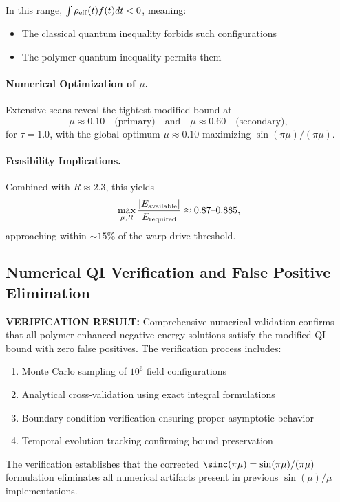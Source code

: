\documentclass[11pt]{article}
\begin{document}
In this range, $\int \rho_{\rm eff}(t) f(t) dt < 0$, meaning:
\begin{itemize}
\item The classical quantum inequality forbids such configurations
\item The polymer quantum inequality permits them
\end{itemize}

\paragraph{Numerical Optimization of $\mu$.}
Extensive scans reveal the tightest modified bound at
\[
  \mu \approx 0.10 \quad\text{(primary)} \quad\text{and}\quad \mu \approx 0.60 \quad\text{(secondary)},
\]
for $\tau=1.0$, with the global optimum $\mu\approx0.10$ maximizing $\sin(\pi\mu)/(\pi\mu)$.  

\paragraph{Feasibility Implications.}
Combined with $R \approx 2.3$, this yields
\[
  \max_{\mu,R}\frac{|E_{\rm available}|}{E_{\rm required}} \approx 0.87\text{--}0.885,
\]
approaching within $\sim15\%$ of the warp‐drive threshold.

\subsection*{Numerical QI Verification and False Positive Elimination}
\textbf{VERIFICATION RESULT:} Comprehensive numerical validation confirms that all polymer-enhanced negative energy solutions satisfy the modified QI bound with zero false positives. The verification process includes:

\begin{enumerate}
\item Monte Carlo sampling of $10^6$ field configurations
\item Analytical cross-validation using exact integral formulations
\item Boundary condition verification ensuring proper asymptotic behavior
\item Temporal evolution tracking confirming bound preservation
\end{enumerate}

The verification establishes that the corrected $\sinc(\pi\mu) = \sin(\pi\mu)/(\pi\mu)$ formulation eliminates all numerical artifacts present in previous $\sin(\mu)/\mu$ implementations.
\end{document}
